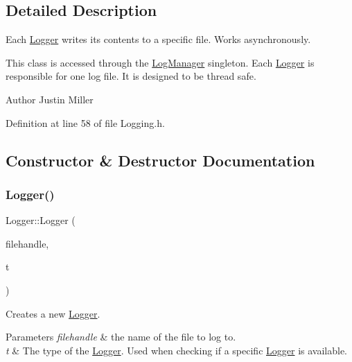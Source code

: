 \subsection{Detailed Description}
Each \mbox{\hyperlink{class_world_architect_1_1_logger}{Logger}} writes it\textquotesingle{}s contents to a specific file. Works asynchronously. 

This class is accessed through the \mbox{\hyperlink{class_world_architect_1_1_log_manager}{Log\+Manager}} singleton. Each \mbox{\hyperlink{class_world_architect_1_1_logger}{Logger}} is responsible for one log file. It is designed to be thread safe.

\begin{DoxyAuthor}{Author}
Justin Miller 
\end{DoxyAuthor}


Definition at line 58 of file Logging.\+h.



\subsection{Constructor \& Destructor Documentation}
\mbox{\label{class_world_architect_1_1_logger_a0622bdbc65338ff51fac19c5b0605639}} 
\subsubsection{\texorpdfstring{Logger()}{Logger()}}
{\footnotesize\ttfamily Logger\+::\+Logger (\begin{DoxyParamCaption}\item[{std\+::string}]{filehandle,  }\item[{\mbox{\hyperlink{namespace_world_architect_adf13e54f2c38346ed9d5013cff07fc8e}{Log\+Type}}}]{t }\end{DoxyParamCaption})}



Creates a new \mbox{\hyperlink{class_world_architect_1_1_logger}{Logger}}. 


\begin{DoxyParams}{Parameters}
{\em filehandle} & the name of the file to log to. \\
\hline
{\em t} & The type of the \mbox{\hyperlink{class_world_architect_1_1_logger}{Logger}}. Used when checking if a specific \mbox{\hyperlink{class_world_architect_1_1_logger}{Logger}} is available. \\
\hline
\end{DoxyParams}


